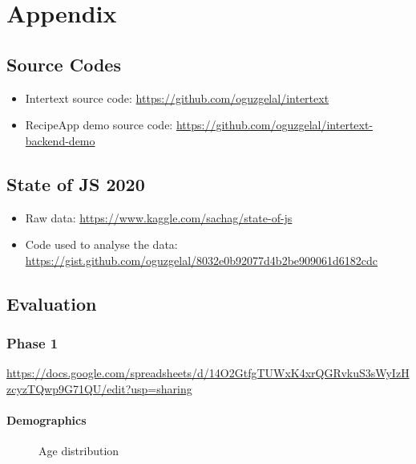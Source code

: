 \chapter{Appendix} \label{App:AppendixA}

\section{Source Codes}

\begin{itemize}
    \item Intertext source code: \url{https://github.com/oguzgelal/intertext}
    
    \item RecipeApp demo source code: \url{https://github.com/oguzgelal/intertext-backend-demo}
\end{itemize}

\section{State of JS 2020}

\begin{itemize}
    \item Raw data: \url{https://www.kaggle.com/sachag/state-of-js}
    \item Code used to analyse the data: \url{https://gist.github.com/oguzgelal/8032e0b92077d4b2be909061d6182cdc}
\end{itemize}


\section{Evaluation}

\subsection{Phase 1}

\url{https://docs.google.com/spreadsheets/d/14O2GtfgTUWxK4xrQGRvkuS3sWyIzHzcyzTQwp9G71QU/edit?usp=sharing}

\subsubsection{Demographics}

\begin{figure}[H]
\centering
{}
\vspace*{-1mm}
\caption{Age distribution}
\end{figure}


